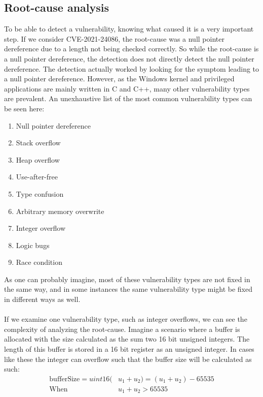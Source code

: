 \documentclass{report}
\begin{document}
\subsection{Root-cause analysis}
To be able to detect a vulnerability, knowing what caused it is a very important step. If we consider CVE-2021-24086, the root-cause was a null pointer dereference due to a length not being checked correctly. So while the root-cause is a null pointer dereference, the detection does not directly detect the null pointer dereference. The detection actually worked by looking for the symptom leading to a null pointer dereference. However, as the Windows kernel and privileged applications are mainly written in C and C++, many other vulnerability types are prevalent. An unexhaustive list of the most common vulnerability types can be seen here:

\begin{enumerate}
    \item Null pointer dereference
    \item Stack overflow
    \item Heap overflow
    \item Use-after-free
    \item Type confusion
    \item Arbitrary memory overwrite
    \item Integer overflow
    \item Logic bugs
    \item Race condition
\end{enumerate}

As one can probably imagine, most of these vulnerability types are not fixed in the same way, and in some instances the same vulnerability type might be fixed in different ways as well.
\\
\\
If we examine one vulnerability type, such as integer overflows, we can see the complexity of analyzing the root-cause. Imagine a scenario where a buffer is allocated with the size calculated as the sum two 16 bit unsigned integers. The length of this buffer is stored in a 16 bit register as an unsigned integer. In cases like these the integer can overflow such that the buffer size will be calculated as such:
\begin{align}
    \text{bufferSize} = uint16(&u_1 + u_2) = (u_1 + u_2) - 65535 \\
    \text{When }&u_1 + u_2 > 65535 \nonumber
\end{align}
\end{document}
